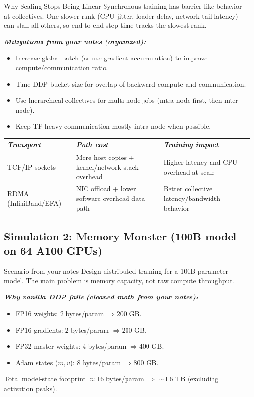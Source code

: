 \documentclass[12pt]{article}
\let\origtextbf\textbf
\renewcommand{\textbf}[1]{\origtextbf{\textit{#1}}}
\begin{document}
\begin{redbox}{Why Scaling Stops Being Linear}
Synchronous training has barrier-like behavior at collectives.  
One slower rank (CPU jitter, loader delay, network tail latency) can stall all others, so end-to-end step time tracks the slowest rank.
\end{redbox}

\textbf{Mitigations from your notes (organized):}
\begin{itemize}
\item Increase global batch (or use gradient accumulation) to improve compute/communication ratio.
\item Tune DDP bucket size for overlap of backward compute and communication.
\item Use hierarchical collectives for multi-node jobs (intra-node first, then inter-node).
\item Keep TP-heavy communication mostly intra-node when possible.
\end{itemize}

{\footnotesize
\begin{tabularx}{\textwidth}{|>{\raggedright\arraybackslash}p{2.8cm}|X|X|}
\hline
\textbf{Transport} & \textbf{Path cost} & \textbf{Training impact} \\
\hline
TCP/IP sockets & More host copies + kernel/network stack overhead & Higher latency and CPU overhead at scale \\
\hline
RDMA (InfiniBand/EFA) & NIC offload + lower software overhead data path & Better collective latency/bandwidth behavior \\
\hline
\end{tabularx}
}

\subsection{Simulation 2: Memory Monster (100B model on 64 A100 GPUs)}

\begin{greenbox}{Scenario from your notes}
Design distributed training for a 100B-parameter model. The main problem is memory capacity, not raw compute throughput.
\end{greenbox}

\textbf{Why vanilla DDP fails (cleaned math from your notes):}
\begin{itemize}
\item FP16 weights: \(2\) bytes/param \(\Rightarrow 200\) GB.
\item FP16 gradients: \(2\) bytes/param \(\Rightarrow 200\) GB.
\item FP32 master weights: \(4\) bytes/param \(\Rightarrow 400\) GB.
\item Adam states (\(m,v\)): \(8\) bytes/param \(\Rightarrow 800\) GB.
\end{itemize}
Total model-state footprint \(\approx 16\) bytes/param \(\Rightarrow\) \(\sim1.6\) TB (excluding activation peaks).
\end{document}
